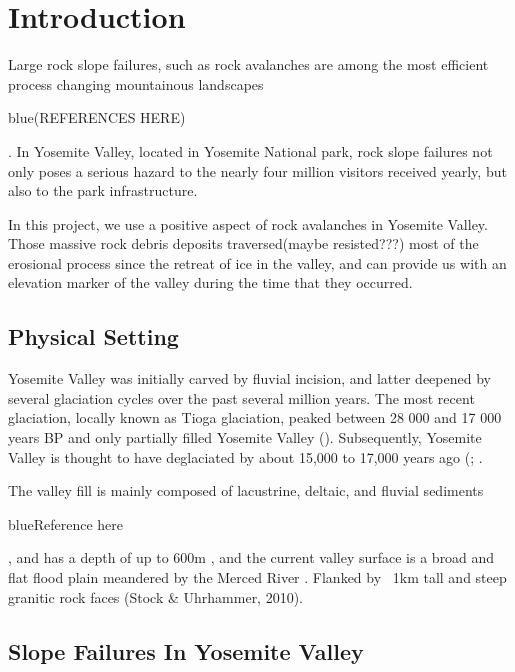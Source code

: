 \documentclass[5p]{elsarticle}
\newcommand{\COMON}{\begin{color}{blue}}
\newcommand{\COMOFF}{\end{color}}
\begin{document}






\section{Introduction}

Large rock slope failures, such as rock avalanches are among the most efficient process changing mountainous landscapes \COMON (REFERENCES HERE) \COMOFF. In Yosemite Valley, located in Yosemite National park, rock slope failures not only poses a serious hazard to the nearly four million visitors received yearly, but also to the park infrastructure. 

In this project, we use a positive aspect of rock avalanches in Yosemite Valley. Those massive rock debris deposits traversed(maybe resisted???) most of the erosional process since the retreat of ice in the valley, and can provide us with an elevation marker of the valley during the time that they occurred.  
\bigskip





\subsection{Physical Setting}

Yosemite Valley was initially carved by fluvial incision, and latter deepened by several glaciation cycles over the past several million years. The most recent glaciation, locally known as Tioga glaciation, peaked between 28 000 and 17 000 years BP and only partially filled  Yosemite Valley (\cite{huber1987geologic}). Subsequently, Yosemite Valley is thought to have deglaciated by about 15,000 to 17,000 years ago (\cite{huber1987geologic};  \cite{Wieczorek+1996}.

The valley fill is mainly composed of lacustrine, deltaic, and fluvial sediments \COMON Reference here\COMOFF, and has a depth of up to 600m \cite{gutenberg1956seismic}, and the current valley surface is a broad and flat flood plain meandered by the Merced River \cite{Wieczorek+1996}. Flanked by ~1km tall and steep granitic rock faces (Stock & Uhrhammer, 2010).
\bigskip
    
    
    


\subsection{Slope Failures In Yosemite Valley}
\end{document}
